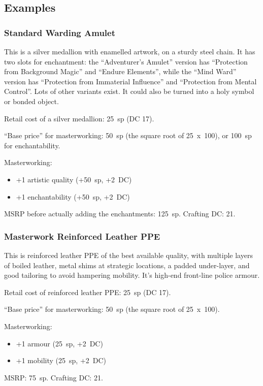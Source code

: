 %
\subsection{Examples}
%
\subsubsection{Standard Warding Amulet}

This is a silver medallion with enamelled artwork, on a sturdy steel chain.
It has two slots for enchantment: the ``Adventurer's Amulet'' version has
``Protection from Background Magic'' and ``Endure Elements'', while the
``Mind Ward'' version has ``Protection from Immaterial Influence'' and
``Protection from Mental Control''. Lots of other variants exist. It could
also be turned into a holy symbol or bonded object.

Retail cost of a silver medallion: 25~sp (DC 17).

``Base price'' for masterworking: 50~sp (the square root of 25~x~100), or
100~sp for enchantability.

Masterworking:
\begin{itemize}
\item +1 artistic quality (+50~sp, +2~DC)
\item +1 enchantability (+50~sp, +2~DC)
\end{itemize}

MSRP before actually adding the enchantments: 125~sp. Crafting DC: 21.
%
\subsubsection{Masterwork Reinforced Leather PPE}

This is reinforced leather PPE of the best available quality, with multiple
layers of boiled leather, metal shims at strategic locations, a padded
under-layer, and good tailoring to avoid hampering mobility. It's high-end
front-line police armour.

Retail cost of reinforced leather PPE: 25~sp (DC 17).

``Base price'' for masterworking: 50~sp (the square root of 25~x~100).

Masterworking:
\begin{itemize}
\item +1 armour (25~sp, +2~DC)
\item +1 mobility (25~sp, +2~DC)
\end{itemize}

MSRP: 75~sp. Crafting DC: 21.

